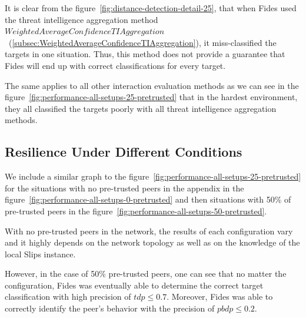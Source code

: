 It is clear from the figure~\ref{fig:distance-detection-detail-25}, that when Fides used the threat intelligence aggregation method  $WeightedAverageConfidenceTIAggregation$~(\ref{subsec:WeightedAverageConfidenceTIAggregation}), it miss-classified the targets in one situation.
Thus, this method does not provide a guarantee that Fides will end up with correct classifications for every target.

The same applies to all other interaction evaluation methods as we can see in the figure~\ref{fig:performance-all-setups-25-pretrusted} that in the hardest environment, they all classified the targets poorly with all threat intelligence aggregation methods.

\subsection{Resilience Under Different Conditions}
\label{subsec:resilience-under-different-conditions}

We include a similar graph to the figure~\ref{fig:performance-all-setups-25-pretrusted} for the situations with no pre-trusted peers in the appendix in the figure~\ref{fig:performance-all-setups-0-pretrusted} and then situations with 50\% of pre-trusted peers in the figure~\ref{fig:performance-all-setups-50-pretrusted}.

With no pre-trusted peers in the network, the results of each configuration vary and it highly depends on the network topology as well as on the knowledge of the local Slips instance.

However, in the case of 50\% pre-trusted peers, one can see that no matter the configuration, Fides was eventually able to determine the correct target classification with high precision of $tdp \leq 0.7$. Moreover, Fides was able to correctly identify the peer's behavior with the precision of $pbdp \leq 0.2$.